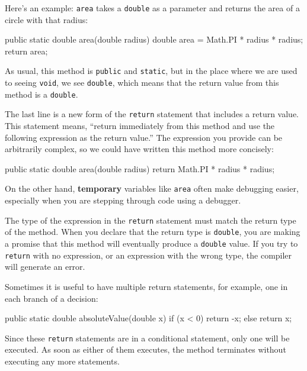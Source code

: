 \documentclass[12pt]{book}
\theoremstyle{exercise}
\newcommand{\java}[1]{\verb"#1"}
\newcommand{\java}[1]{\lstinline{#1}} %
\begin{document}
Here's an example:  \java{area} takes a \java{double} as a parameter and returns the area of a circle with that radius:

\begin{code}
    public static double area(double radius) {
        double area = Math.PI * radius * radius;
        return area;
    }
\end{code}

As usual, this method is \java{public} and \java{static}, but in the place where we are used to seeing \java{void}, we see \java{double}, which means that the return value from this method is a \java{double}.


The last line is a new form of the \java{return} statement that includes a return value.
This statement means, ``return immediately from this method and use the following expression as the return value.''
The expression you provide can be arbitrarily complex, so we could have written this method more concisely:

\begin{code}
    public static double area(double radius) {
        return Math.PI * radius * radius;
    }
\end{code}


On the other hand, {\bf temporary} variables like \java{area} often make debugging easier, especially when you are stepping through code using a debugger.

The type of the expression in the \java{return} statement must match the return type of the method.
When you declare that the return type is \java{double}, you are making a promise that this method will eventually produce a \java{double} value.
If you try to \java{return} with no expression, or an expression with the wrong type, the compiler will generate an error.

Sometimes it is useful to have multiple return statements, for example, one in each branch of a decision:

\begin{code}
    public static double absoluteValue(double x) {
        if (x < 0) {
            return -x;
        } else {
            return x;
        }
    }
\end{code}

Since these \java{return} statements are in a conditional statement, only one will be executed.
As soon as either of them executes, the method terminates without executing any more statements.
\end{document}
